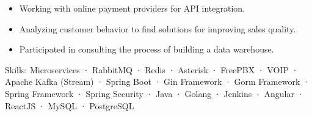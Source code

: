 {\begin{cvitems}
{\begin{itemize}
                \item { Working with online payment providers for API integration. }
                \item { Analyzing customer behavior to find solutions for improving sales quality. }
                \item { Participated in consulting the process of building a data warehouse. }
            \end{itemize}
        }
        \item {Skills: Microservices · RabbitMQ · Redis · Asterisk · FreePBX · VOIP · Apache Kafka (Stream) · Spring Boot · Gin Framework · Gorm Framework · Spring Framework · Spring Security · Java · Golang · Jenkins · Angular · ReactJS · MySQL · PostgreSQL}
      \end{cvitems}
    }
